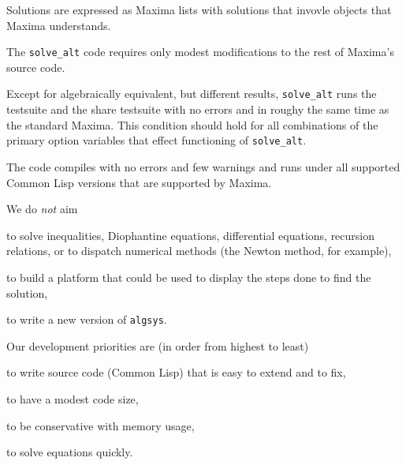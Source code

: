 \documentclass[]{article}%
\newcommand{\altsolve}{\texttt{solve\_alt}}
\newcommand{\algsys}{\texttt{algsys}}
\begin{document}
\begin{alphalist}[noitemsep]

\item  Solutions are expressed as Maxima lists with solutions that invovle objects that Maxima understands.

 \item The \altsolve\/ code requires only modest modifications to the rest of Maxima's source code.

\item Except for algebraically equivalent, but different results, \altsolve\/  runs the testsuite and the share testsuite with no errors and in roughy the same time as the standard Maxima. This condition should hold for
all combinations of the primary option variables that effect functioning of \altsolve.

\item The code compiles with no errors and few warnings and runs under all supported Common Lisp versions that are supported by Maxima.
\end{alphalist}
We do \emph{not} aim
\begin{alphalist}[noitemsep]

\item to solve inequalities, Diophantine equations, differential equations, recursion relations, or to dispatch numerical methods (the Newton method, for example),

\item to build a platform that could be used to display the steps done to find the solution,

\item to write a new version of \algsys.

\end{alphalist}
Our development priorities are (in order from highest to least)

\begin{alphalist}[noitemsep]

\item to write source code (Common Lisp) that is easy to extend and to fix,

\item to have a modest code size,

\item to be conservative with memory usage,

\item to solve equations quickly.

\end{alphalist}
\end{document}
